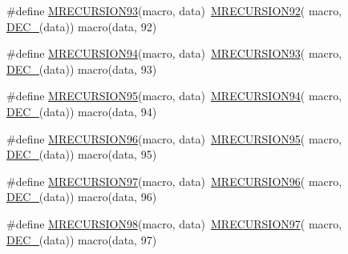 \begin{DoxyCompactItemize}
\item 
\#define \mbox{\hyperlink{group__group__sam0__utils__mrecursion_gaf2a7b1d3f531f42ba19275b3bfbc5096}{M\+R\+E\+C\+U\+R\+S\+I\+O\+N93}}(macro,  data)~\mbox{\hyperlink{group__group__sam0__utils__mrecursion_gab27a1381cfcad4d4398dbd87166b9189}{M\+R\+E\+C\+U\+R\+S\+I\+O\+N92}}(  macro, \mbox{\hyperlink{group__group__sam0__utils__mrecursion_ga1d23d683797679dca8c3512a54a5dcae}{D\+E\+C\+\_\+}}(data))   macro(data, 92)
\item 
\#define \mbox{\hyperlink{group__group__sam0__utils__mrecursion_ga71bbdabe0dca572550f55f325fdbcc53}{M\+R\+E\+C\+U\+R\+S\+I\+O\+N94}}(macro,  data)~\mbox{\hyperlink{group__group__sam0__utils__mrecursion_gaf2a7b1d3f531f42ba19275b3bfbc5096}{M\+R\+E\+C\+U\+R\+S\+I\+O\+N93}}(  macro, \mbox{\hyperlink{group__group__sam0__utils__mrecursion_ga1d23d683797679dca8c3512a54a5dcae}{D\+E\+C\+\_\+}}(data))   macro(data, 93)
\item 
\#define \mbox{\hyperlink{group__group__sam0__utils__mrecursion_ga1f84d15b7e60fc215e8ebe7b5b151084}{M\+R\+E\+C\+U\+R\+S\+I\+O\+N95}}(macro,  data)~\mbox{\hyperlink{group__group__sam0__utils__mrecursion_ga71bbdabe0dca572550f55f325fdbcc53}{M\+R\+E\+C\+U\+R\+S\+I\+O\+N94}}(  macro, \mbox{\hyperlink{group__group__sam0__utils__mrecursion_ga1d23d683797679dca8c3512a54a5dcae}{D\+E\+C\+\_\+}}(data))   macro(data, 94)
\item 
\#define \mbox{\hyperlink{group__group__sam0__utils__mrecursion_ga3e4d11ac26580cc1a2f0c9df299a0414}{M\+R\+E\+C\+U\+R\+S\+I\+O\+N96}}(macro,  data)~\mbox{\hyperlink{group__group__sam0__utils__mrecursion_ga1f84d15b7e60fc215e8ebe7b5b151084}{M\+R\+E\+C\+U\+R\+S\+I\+O\+N95}}(  macro, \mbox{\hyperlink{group__group__sam0__utils__mrecursion_ga1d23d683797679dca8c3512a54a5dcae}{D\+E\+C\+\_\+}}(data))   macro(data, 95)
\item 
\#define \mbox{\hyperlink{group__group__sam0__utils__mrecursion_gab9ed28d94481bd01b1c3edcc6fce2dd6}{M\+R\+E\+C\+U\+R\+S\+I\+O\+N97}}(macro,  data)~\mbox{\hyperlink{group__group__sam0__utils__mrecursion_ga3e4d11ac26580cc1a2f0c9df299a0414}{M\+R\+E\+C\+U\+R\+S\+I\+O\+N96}}(  macro, \mbox{\hyperlink{group__group__sam0__utils__mrecursion_ga1d23d683797679dca8c3512a54a5dcae}{D\+E\+C\+\_\+}}(data))   macro(data, 96)
\item 
\#define \mbox{\hyperlink{group__group__sam0__utils__mrecursion_ga09220b4e632b8d49bf826fee3f9235c7}{M\+R\+E\+C\+U\+R\+S\+I\+O\+N98}}(macro,  data)~\mbox{\hyperlink{group__group__sam0__utils__mrecursion_gab9ed28d94481bd01b1c3edcc6fce2dd6}{M\+R\+E\+C\+U\+R\+S\+I\+O\+N97}}(  macro, \mbox{\hyperlink{group__group__sam0__utils__mrecursion_ga1d23d683797679dca8c3512a54a5dcae}{D\+E\+C\+\_\+}}(data))   macro(data, 97)

\end{DoxyCompactItemize}
